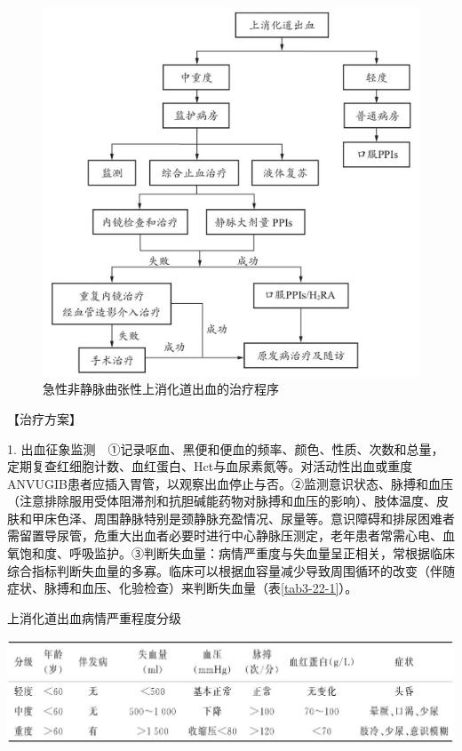 \begin{figure}[!htbp]
 \centering
 \includegraphics{./images/Image00116.jpg}
 \captionsetup{justification=centering}
 \caption{急性非静脉曲张性上消化道出血的治疗程序}
 \label{fig3-22-2}
  \end{figure} 

【治疗方案】

1.
出血征象监测　①记录呕血、黑便和便血的频率、颜色、性质、次数和总量，定期复查红细胞计数、血红蛋白、Hct与血尿素氮等。对活动性出血或重度ANVUGIB患者应插入胃管，以观察出血停止与否。②监测意识状态、脉搏和血压（注意排除服用受体阻滞剂和抗胆碱能药物对脉搏和血压的影响）、肢体温度、皮肤和甲床色泽、周围静脉特别是颈静脉充盈情况、尿量等。意识障碍和排尿困难者需留置导尿管，危重大出血者必要时进行中心静脉压测定，老年患者常需心电、血氧饱和度、呼吸监护。③判断失血量：病情严重度与失血量呈正相关，常根据临床综合指标判断失血量的多寡。临床可以根据血容量减少导致周围循环的改变（伴随症状、脉搏和血压、化验检查）来判断失血量（表\ref{tab3-22-1}）。

\begin{table}[htbp]
\centering
\caption{上消化道出血病情严重程度分级}
\label{tab3-22-1}
\includegraphics{./images/Image00117.jpg}
\end{table}

